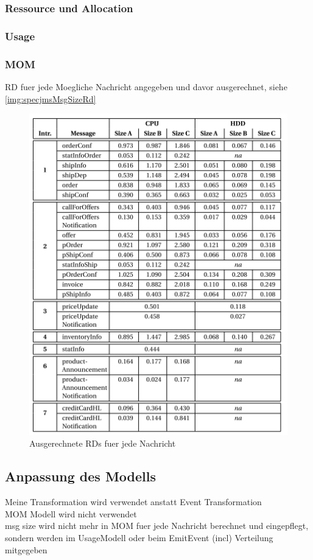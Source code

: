 \subsubsection{Ressource und Allocation}
\subsubsection{Usage}
\subsubsection{MOM}
RD fuer jede Moegliche Nachricht angegeben und davor ausgerechnet, siehe \autoref{img:specjmsMsgSizeRd} \\
\begin{figure}
\center
  \includegraphics[width=1\textwidth]{images/specjmsmsgsizerd.png}
  \caption{Ausgerechnete RDs fuer jede Nachricht}
  \label{img:specjmsMsgSizeRd}
\end{figure}


\subsection{Anpassung des Modells}
Meine Transformation wird verwendet anstatt Event Transformation \\
MOM Modell wird nicht verwendet\\
msg size wird nicht mehr in MOM fuer jede Nachricht berechnet und eingepflegt, sondern werden im UsageModell oder beim EmitEvent (incl) Verteilung mitgegeben \\

